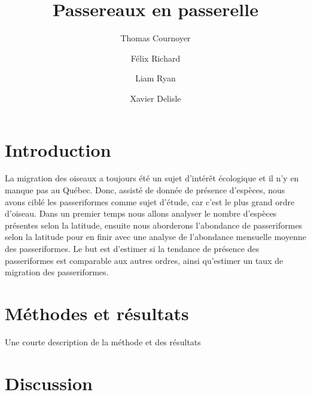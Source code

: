 \documentclass[9pt,twocolumn,twoside,]{pnas-new}
\title{Passereaux en passerelle}
\author[]{Thomas Cournoyer}
\author[]{Félix Richard}
\author[]{Liam Ryan}
\author[]{Xavier Delisle}
\affil[]{Université de Sherbrooke, Cours BIO500}
\begin{document}
\verticaladjustment{-2pt}



\maketitle
\thispagestyle{firststyle}


\acknow{}

\hypertarget{introduction}{%
\section*{Introduction}\label{introduction}}

La migration des oiseaux a toujours été un sujet d'intérêt écologique et
il n'y en manque pas au Québec. Donc, assisté de donnée de présence
d'espèces, nous avons ciblé les passeriformes comme sujet d'étude, car
c'est le plus grand ordre d'oiseau. Dans un premier temps nous allons
analyser le nombre d'espèces présentes selon la latitude, ensuite nous
aborderons l'abondance de passeriformes selon la latitude pour en finir
avec une analyse de l'abondance mensuelle moyenne des passeriformes. Le
but est d'estimer si la tendance de présence des passeriformes est
comparable aux autres ordres, ainsi qu'estimer un taux de migration des
passeriformes.

\hypertarget{muxe9thodes-et-ruxe9sultats}{%
\section*{Méthodes et résultats}\label{muxe9thodes-et-ruxe9sultats}}

Une courte description de la méthode et des résultats

\hypertarget{submitting-manuscripts}{%
\section*{Discussion}\label{submitting-manuscripts}}
\end{document}
